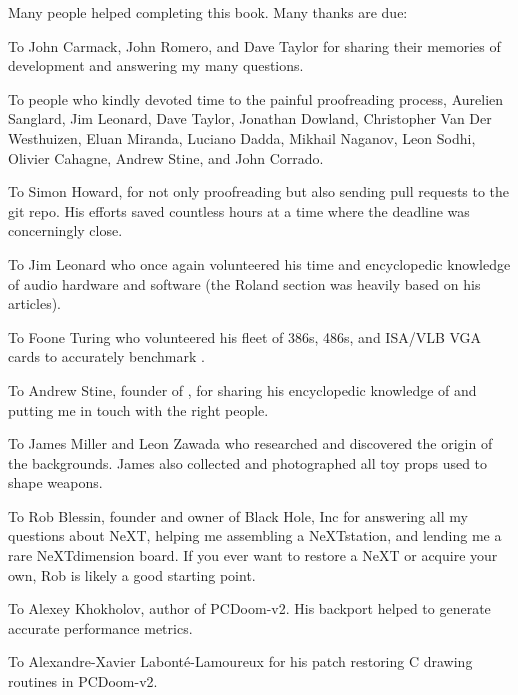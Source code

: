 Many people helped completing this book. Many thanks are due:\\
\par
To John Carmack, John Romero, and Dave Taylor for sharing their memories of \doom{} development and answering my many questions.\\
\par
To people who kindly devoted time to the painful proofreading process, Aurelien Sanglard, Jim Leonard, Dave Taylor, Jonathan Dowland, Christopher Van Der Westhuizen, Eluan Miranda, Luciano Dadda, Mikhail Naganov, Leon Sodhi, Olivier Cahagne, Andrew Stine, and John Corrado.\\
\par
To Simon Howard, for not only proofreading but also sending pull requests to the git repo. His efforts saved countless hours at a time where the deadline was
concerningly close.\\
\par
To Jim Leonard who once again volunteered his time and encyclopedic knowledge of audio hardware and software (the Roland section was heavily based on his articles).\\
\par
To Foone Turing who volunteered his fleet of 386s, 486s, and ISA/VLB VGA cards to accurately benchmark \doom{}.\\
\par
To Andrew Stine, founder of , for sharing his encyclopedic knowledge of \doom{} and putting me in touch with the right people.\\
\par
To James Miller and Leon Zawada who researched and discovered the origin of the backgrounds. James also collected and photographed all toy props used to shape \doom{} weapons.\\
\par
To Rob Blessin, founder and owner of Black Hole, Inc for answering all my questions about NeXT, helping me assembling a NeXTstation, and lending me a rare NeXTdimension board. If you ever want to restore a NeXT or acquire your own, Rob is likely a good starting point.\\
\par
To Alexey Khokholov, author of PCDoom-v2. His backport helped to generate accurate performance metrics.\\
\par
To Alexandre-Xavier Labont\'e-Lamoureux for his patch restoring C drawing routines in PCDoom-v2.\\
